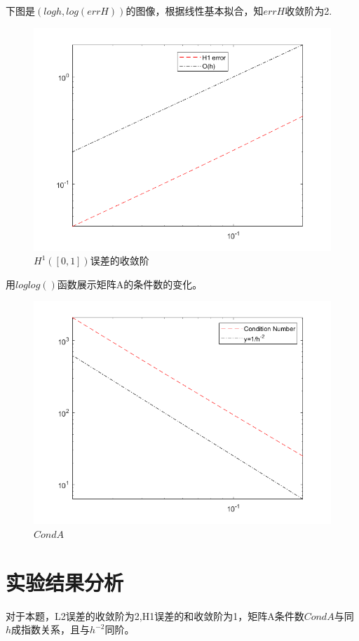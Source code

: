 \documentclass{article}
\begin{document}
\newpage
下图是$(logh,log(errH))$的图像，根据线性基本拟合，知$errH$收敛阶为2.
\begin{figure}[H]
\centering
\includegraphics[scale=0.5]{errH1.png}
\caption{\label{H1_err}$H^{1}([0,1])$误差的收敛阶}
\end{figure}



用$loglog()$函数展示矩阵A的条件数的变化。
\begin{figure}[H]
\centering
\includegraphics[scale=0.5]{CondA.png}
\caption{\label{CondA}$CondA$}
\end{figure}


\section{实验结果分析}
对于本题，L2误差的收敛阶为2,H1误差的和收敛阶为1，矩阵A条件数$CondA$与同$h$成指数关系，且与$h^{-2}$同阶。
\end{document}
